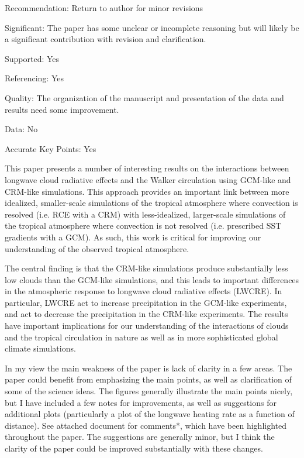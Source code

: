 \documentclass[draft]{agujournal2019}
\begin{document}
Recommendation: Return to author for minor revisions

Significant: The paper has some unclear or incomplete reasoning but will likely be a significant contribution with revision and 
clarification.

Supported: Yes

Referencing: Yes

Quality: The organization of the manuscript and presentation of the data and results need some improvement.

Data: No

Accurate Key Points: Yes

This paper presents a number of interesting results on the interactions between longwave cloud
radiative effects and the Walker circulation using GCM-like and CRM-like simulations. This
approach provides an important link between more idealized, smaller-scale simulations of the
tropical atmosphere where convection is resolved (i.e. RCE with a CRM) with less-idealized,
larger-scale simulations of the tropical atmosphere where convection is not resolved (i.e.
prescribed SST gradients with a GCM). As such, this work is critical for improving our
understanding of the observed tropical atmosphere.

The central finding is that the CRM-like simulations produce substantially less low clouds than
the GCM-like simulations, and this leads to important differences in the atmospheric response to
longwave cloud radiative effects (LWCRE). In particular, LWCRE act to increase precipitation
in the GCM-like experiments, and act to decrease the precipitation in the CRM-like experiments.
The results have important implications for our understanding of the interactions of clouds and
the tropical circulation in nature as well as in more sophisticated global climate simulations.

In my view the main weakness of the paper is lack of clarity in a few areas. The paper could
benefit from emphasizing the main points, as well as clarification of some of the science ideas.
The figures generally illustrate the main points nicely, but I have included a few notes for
improvements, as well as suggestions for additional plots (particularly a plot of the longwave
heating rate as a function of distance). See attached document for comments*, which have been
highlighted throughout the paper. The suggestions are generally minor, but I think the clarity of
the paper could be improved substantially with these changes.

\end{document}
